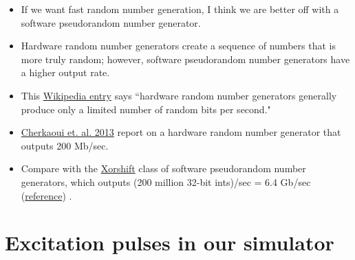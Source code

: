 \documentclass[dvipsnames]{beamer}
\begin{document}
\begin{frame}
\begin{itemize}
\item If we want fast random number generation, I think we are better off with a software pseudorandom number generator.
\item Hardware random number generators create a sequence of numbers that is more truly random; however, software pseudorandom number generators have a higher output rate.
\item This \href{https://en.wikipedia.org/wiki/Hardware_random_number_generator}{Wikipedia entry} says ``hardware random number generators generally produce only a limited number of random bits per second."
\item \href{https://www.iacr.org/archive/ches2013/80860154/80860154.pdf}{Cherkaoui et. al. 2013} report on a hardware random number generator that outputs 200 Mb/sec.
\item Compare with the \href{https://en.wikipedia.org/wiki/Xorshift}{Xorshift} class of software pseudorandom number generators, which outputs (200 million 32-bit ints)/sec = 6.4 Gb/sec (\href{https://scholar.google.ca/scholar?hl=en&as_sdt=0\%2C5&q=xorshift&btnG=}{reference}) .
\end{itemize}
\end{frame}

\section{Excitation pulses in our simulator}
\end{document}
